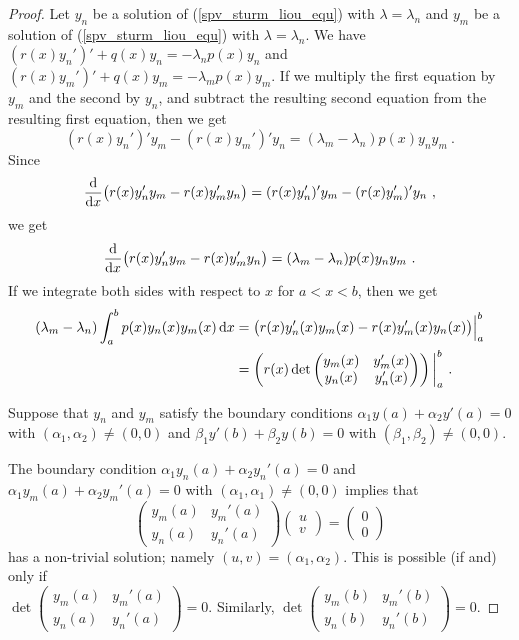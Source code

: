\begin{proof}
Let $y_n$ be a solution of (\ref{spv_sturm_liou_equ}) with
$\lambda=\lambda_n$ and $y_m$ be a solution of (\ref{spv_sturm_liou_equ})
with $\lambda=\lambda_n$.  We have
$\displaystyle (r(x) y_n')' + q(x)y_n = - \lambda_n p(x) y_n$ and
$\displaystyle (r(x) y_m')' + q(x)y_m = - \lambda_m p(x) y_m$.
If we multiply the first equation by $y_m$ and the second by $y_n$, and
subtract the resulting second equation from the resulting first
equation, then we get
\[
(r(x) y_n')'y_m - (r(x) y_m')'y_n = (\lambda_m - \lambda_n)p(x) y_n y_m \ .
\]
Since
\[
\dfdx{\big(r(x) y_n'y_m - r(x) y_m'y_n\big)}{x} =
(r(x) y_n')'y_m - (r(x) y_m')'y_n \ ,
\]
we get
\[
\dfdx{\big(r(x) y_n'y_m - r(x) y_m'y_n\big)}{x}
= (\lambda_m - \lambda_n)p(x) y_n y_m \ .
\]
If we integrate both sides with respect to $x$ for $a< x < b$, then we get
\begin{equation} \label{SL_orth_proof}
\begin{split}
(\lambda_m - \lambda_n) \int_a^b p(x) y_n(x) y_m(x) \dx{x} &=
\big(r(x) y_n'(x)y_m(x) - r(x) y_m'(x)y_n(x)\big)\Big|_a^b \\
&= \left( r(x)
\det \begin{pmatrix} y_m(x) & y_m'(x) \\ y_n(x) & y_n'(x) \end{pmatrix}
\right)\bigg|_a^b \ .
\end{split}
\end{equation}

 Suppose that $y_n$ and $y_m$ satisfy the boundary conditions
$\displaystyle \alpha_1 y(a) + \alpha_2 y'(a) = 0$
with $(\alpha_1,\alpha_2)\neq (0,0)$ and
$\displaystyle \beta_1 y'(b) + \beta_2 y(b) = 0$ with
$(\beta_1,\beta_2) \neq (0,0)$.

The boundary condition
$\alpha_1 y_n(a) + \alpha_2 y_n'(a) = 0$ and
$\alpha_1 y_m(a) + \alpha_2 y_m'(a) = 0$ with
$(\alpha_1,\alpha_1)\neq (0,0)$ implies that
\[
\begin{pmatrix} y_m(a) & y_m'(a) \\ y_n(a) & y_n'(a) \end{pmatrix}
\begin{pmatrix} u \\ v \end{pmatrix}
= \begin{pmatrix} 0 \\ 0 \end{pmatrix}
\]
has a non-trivial solution; namely $(u,v) = (\alpha_1, \alpha_2)$.  This is
possible (if and) only if\\
$\displaystyle 
\det \begin{pmatrix} y_m(a) & y_m'(a) \\ y_n(a) & y_n'(a) \end{pmatrix} = 0$.
Similarly,
$\displaystyle
\det \begin{pmatrix} y_m(b) & y_m'(b) \\ y_n(b) & y_n'(b) \end{pmatrix} = 0$.


\end{proof}
